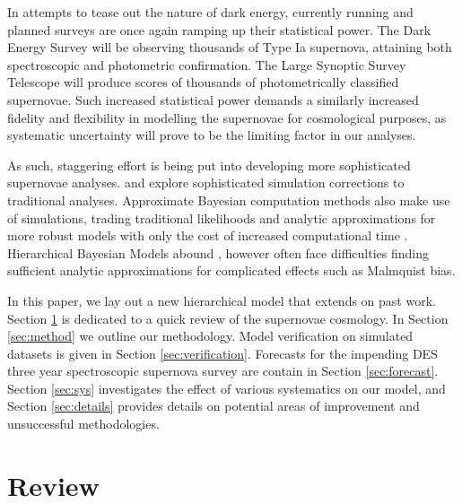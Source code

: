 \documentclass[a4paper,fleqn,usenatbib]{mnras}
\begin{document}
In attempts to tease out the nature of dark energy, currently running and planned surveys are once again ramping up their statistical power. The Dark Energy Survey \citep[DES,][]{Bernstein2012, Abbott2016} will be observing thousands of Type Ia supernova, attaining both spectroscopic and photometric confirmation. The Large Synoptic Survey Telescope \citep[LSST,][]{Ivezic2008, LSSTScienceCollaboration2009} will produce scores of thousands of photometrically classified supernovae. Such increased statistical power demands a similarly increased fidelity and flexibility in modelling the supernovae for cosmological purposes, as systematic uncertainty will prove to be the limiting factor in our analyses.

As such, staggering effort is being put into developing more sophisticated supernovae analyses. \citet{Scolnic2016} and \citet{Kessler2017} explore sophisticated simulation corrections to traditional analyses. Approximate Bayesian computation methods also make use of simulations, trading traditional likelihoods and analytic approximations for more robust models with only the cost of increased computational time \citep{Weyant2013, Jennings2016}. Hierarchical Bayesian Models abound \citep{Mandel2009, March2011, March2014, Rubin2015, Shariff2016, Roberts2017}, however often face difficulties finding sufficient analytic approximations for complicated effects such as Malmquist bias.


In this paper, we lay out a new hierarchical model that extends on past work. Section \ref{sec:review} is dedicated to a quick review of the supernovae cosmology. In Section \ref{sec:method} we outline our methodology. Model verification on simulated datasets is given in Section \ref{sec:verification}. Forecasts for the impending DES three year spectroscopic supernova survey are contain in Section \ref{sec:forecast}. Section \ref{sec:sys} investigates the effect of various systematics on our model, and Section \ref{sec:details} provides details on potential areas of improvement and unsuccessful methodologies.









\section{Review}
\label{sec:review}
\end{document}
